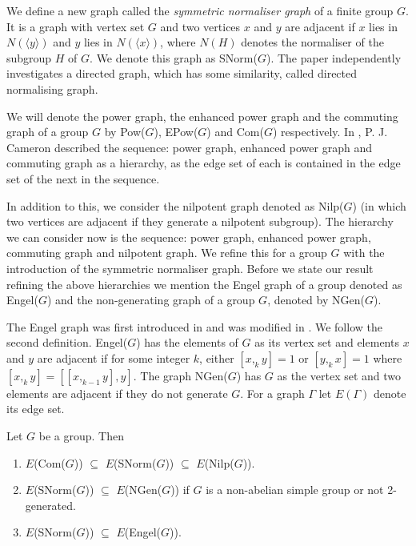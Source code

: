 We define a new graph called the \textit{symmetric normaliser graph} of a finite group $G$. It is a graph with vertex set $G$ and two vertices $x$ and $y$ are adjacent if $x$ lies in $N(\langle y \rangle)$ and $y$ lies in $N(\langle x \rangle)$, where $N(H)$ denotes the normaliser of the subgroup $H$ of $G$. We denote this graph as SNorm($G$). The paper \cite{DGM2025} independently investigates a directed graph, which has some similarity, called directed normalising graph. 
\par
 We will denote the power graph, the enhanced power graph and the commuting graph of a group $G$ by Pow($G$), EPow($G$) and Com($G$) respectively. In \cite{PJC2022}, P. J. Cameron described the sequence: power graph, enhanced power graph and commuting graph as a hierarchy, as the edge set of each is contained in the edge set of the next in the sequence. 

In addition to this, we consider the nilpotent graph denoted as Nilp($G$) (in which two vertices are adjacent if they generate a nilpotent subgroup).  The hierarchy we can consider now is the sequence: power graph, enhanced power graph, commuting graph and nilpotent graph. We refine this for a group $G$ with the introduction of the symmetric normaliser graph. Before we state our result refining the above hierarchies we mention the Engel graph of a group denoted as Engel($G$) and the non-generating graph of a group $G$, denoted by NGen($G$). 

The Engel graph was first introduced in \cite{AA2007} and was modified in \cite{PJC2022}. We follow the second definition. Engel($G$) has the elements of $G$ as its vertex set and elements $x$ and $y$ are adjacent if for some integer $k$, either $[x ,_k y] = 1$ or $[y ,_k x] = 1$ where $[x ,_k y] = [[x ,_{k-1} y],y]$. The graph NGen($G$) has $G$ as the vertex set and two elements are adjacent if they do not generate $G$. For a graph $\Gamma$ let $E(\Gamma)$ denote its edge set.

\begin{thm}\label{thm_1}
    Let $G$ be a group. Then
    \begin{enumerate}[{\rm (i)}]
        \item $E$\rm{(Com(}$G$\rm{))} $\subseteq$ $E$\rm{(SNorm(}$G$\rm{))} $\subseteq$ $E$\rm{(Nilp(}$G$\rm{))}.
        \item  $E$\rm{(SNorm(}$G$\rm{))} $\subseteq$ $E$\rm{(NGen(}$G$\rm{))} if $G$ is a non-abelian simple group or not 2-generated. 
        \item $E$\rm{(SNorm(}$G$\rm{))} $\subseteq$ $E$\rm{(Engel(}$G$\rm{))}.
    \end{enumerate}
\end{thm}


